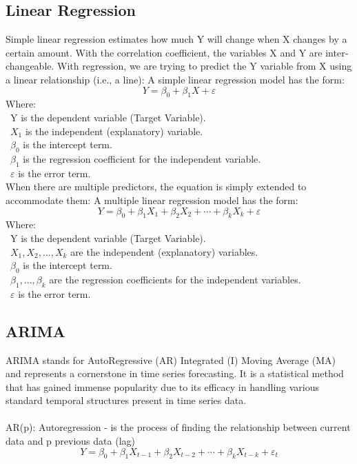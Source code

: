 \documentclass{ieeeojies}
\begin{document}
\subsection{Linear Regression}
Simple linear regression \cite{b12} estimates how much Y will change when X changes by a
certain amount. With the correlation coefficient, the variables X and Y are inter‐
changeable. With regression, we are trying to predict the Y variable from X using a
linear relationship (i.e., a line):
A simple linear regression model has the form: 
\[Y=\beta_0+\beta_1X+\varepsilon\]
Where:\\
	\indent\textbullet\ Y is the dependent variable (Target Variable).\\
	\indent\textbullet\ \(X_1\) is the independent (explanatory) variable.\\
	\indent\textbullet\ \(\beta_0\) is the intercept term.\\
	\indent\textbullet\ \(\beta_1\) is the regression coefficient for the independent variable.\\
	\indent\textbullet\ \(\varepsilon\) is the error term.\\

When there are multiple predictors, the equation is simply extended to accommodate
them:
A multiple linear regression model has the form: 
\[Y=\beta_0+\beta_1X_1+\beta_2X_2+\cdots+\beta_kX_k+\varepsilon\]
Where:\\
	\indent\textbullet\ Y is the dependent variable (Target Variable).\\
	\indent\textbullet\ \(X_1, X_2, \ldots, X_k\) are the independent (explanatory) variables.\\
	\indent\textbullet\ \(\beta_0\) is the intercept term.\\
	\indent\textbullet\ \(\beta_1,..., \beta_k\) are the regression coefficients for the independent variables.\\
	\indent\textbullet\ \(\varepsilon\) is the error term.

\subsection{ARIMA}
\indent ARIMA \cite{b13} stands for AutoRegressive (AR) Integrated (I) Moving Average (MA) and represents a cornerstone in time series forecasting. It is a statistical method that has gained immense popularity due to its efficacy in handling various standard temporal structures present in time series data.\\
\\
\indent AR(p): Autoregression - is the process of finding the relationship between
current data and p previous data (lag)
\[Y=\beta_0+\beta_1X_{t-1}+\beta_2X_{t-2}+\cdots+\beta_kX_{t-k}+\varepsilon_{t}\]
\end{document}
